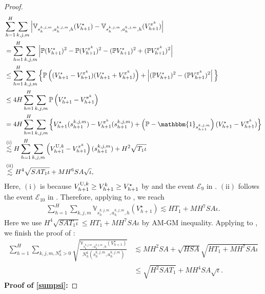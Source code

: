 \documentclass{article}
\newcommand{\U}{\textnormal{U}}
\begin{document}
\begin{proof}
    \begin{align}
        &\sum_{h=1}^H\sum_{k,j,m}\left|\mathbb{V}_{s_h^{k,j,m}, a_h^{k,j,m}, h} (V_{h+1}^{\star})-\mathbb{V}_{s_h^{k,j,m}, a_h^{k,j,m}, h} (V_{h+1}^{\pi^k})\right| \nonumber \\
    &= \sum_{h=1}^{H} \sum_{k,j,m} \left| \mathbb{P} (V_{h+1}^{\star})^2 - \mathbb{P} (V_{h+1}^{\pi^k})^2 - (\mathbb{P} V_{h+1}^{\star})^2 + (\mathbb{P} V_{h+1}^{\pi^k})^2 \right| \notag \\
    &\leq \sum_{h=1}^{H} \sum_{k,j,m} \Big\{ \mathbb{P} \left( (V_{h+1}^{\star} - V_{h+1}^{\pi^k}) (V_{h+1}^{\star} + V_{h+1}^{\pi^k}) \right) + \left| (\mathbb{P} V_{h+1}^{\star})^2 - (\mathbb{P}V_{h+1}^{\pi^k})^2 \right| \Big\} \nonumber \\
    &\leq 4H \sum_{h=1}^{H}\sum_{k,j,m} \mathbb{P}\left(V_{h+1}^{\star} - V_{h+1}^{\pi^k}\right) \nonumber \\
    &= 4H \sum_{h=1}^{H}\sum_{k,j,m}  \Big\{ V_{h+1}^{\star} (s_{h+1}^{k,j,m}) - V_{h+1}^{\pi^k} (s_{h+1}^{k,j,m}) + \left(\mathbb{P} - \mathbbm{1}_{s_{h+1}^{k,j,m}}\right) (V_{h+1}^{\star} - V_{h+1}^{\pi^k}) \Big\} \nonumber \\
    &\overset{\mathrm{(i)}}{\lesssim} H \sum_{h=1}^{H}\sum_{k,j,m} \left(V_{h+1}^{\U,k} - V_{h+1}^{\pi^k}\right)(s_{h+1}^{k,j,m}) + H^2\sqrt{T_1\iota} \nonumber \\
    &\overset{\mathrm{(ii)}}{\lesssim} H^4\sqrt{SAT_1\iota} + MH^6SA\sqrt{\iota}, \label{vstarmiddle2}
    \end{align}
    Here, $\mathrm{(i)}$ is because $V_{h+1}^{\U,k} \geq V_{h+1}^{k}\geq V_{h+1}^{\star}$ by  and the event $\mathcal{E}_9$ in .  $\mathrm{(ii)}$ follows the event $\mathcal{E}_{10}$ in . Therefore, applying  to , we reach
    \begin{align}
        \label{sumvarvstar}
        \sum_{h=1}^H\sum_{k,j,m}\mathbb{V}_{s_h^{k,j,m}, a_h^{k,j,m}, h} (V_{h+1}^{\star}) 
        \lesssim HT_1 + MH^7SA\iota.
    \end{align}
    Here we use $H^4\sqrt{SAT_1\iota} \leq HT_1 + MH^7SA\iota$ by AM-GM inequality. Applying  to , we finish the proof of :
    \begin{align*}
        \sum_{h=1}^H\sum_{k,j,m,N_h^k >0}\sqrt{\frac{\mathbb{V}_{s_h^{k,j,m}, a_h^{k,j,m}, h} (V_{h+1}^{\star})}{N_h^k(s_h^{k,j,m}, a_h^{k,j,m})}} 
        &\lesssim MH^2SA+\sqrt{HSA}\sqrt{HT_1 + MH^7SA\iota}  \\
        &\leq \sqrt{H^2SAT_1}+MH^4SA\sqrt{\iota}.
    \end{align*}
\textbf{Proof of \cref{sumpsi}:}


\end{proof}
\end{document}
